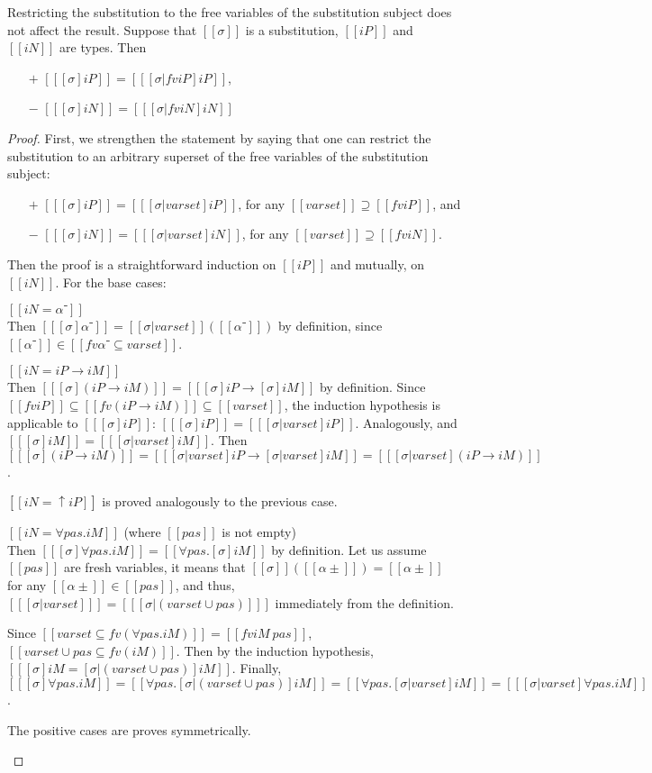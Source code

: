 \begin{lemma}
  \label{lemma:subst-restr-fv}
  Restricting the substitution to the free variables of the
  substitution subject does not affect the result.
  Suppose that $[[σ]]$ is a substitution,
  $[[iP]]$ and $[[iN]]$ are types. Then
 \begin{itemize}
    \item[$+$] $[[ [σ]iP ]] = [[ [σ|fv iP]iP ]]$,
    \item[$-$] $[[ [σ]iN ]] = [[ [σ|fv iN]iN ]]$
  \end{itemize}
\end{lemma}
\begin{proof}
  First, we strengthen the statement by saying that
  one can restrict the substitution to an arbitrary
  superset of the free variables of the substitution subject:
 \begin{itemize}
    \item[$+$] $[[ [σ]iP ]] = [[ [σ|varset]iP ]]$, for any $[[varset]] \supseteq [[fv iP]]$, and
    \item[$-$] $[[ [σ]iN ]] = [[ [σ|varset]iN ]]$, for any $[[varset]] \supseteq [[fv iN]]$.
  \end{itemize}
  Then the proof is a straightforward induction on $[[iP]]$ and mutually, on $[[iN]]$.
  For the base cases: 
  \begin{caseof}
    \item $[[iN = α⁻]]$\\
      Then $[[ [σ]α⁻ ]] = [[σ|varset]] ([[α⁻]])$ by definition, 
      since $[[α⁻]] \in [[fv α⁻ ⊆ varset]]$.
    \item $[[iN = iP → iM]]$\\
      Then $[[ [σ](iP → iM) ]] = [[ [σ]iP → [σ]iM ]]$ by definition.
      Since $[[fv iP]] \subseteq [[fv(iP → iM)]] \subseteq [[varset]]$, 
      the induction hypothesis is applicable to $[[ [σ]iP ]]$: 
      $[[ [σ]iP ]] = [[ [σ|varset]iP ]]$. 
      Analogously, and $[[ [σ]iM ]] = [[ [σ|varset]iM ]]$.
      Then 
      $[[ [σ](iP → iM) ]] = [[ [σ|varset]iP → [σ|varset]iM ]]
       = [[ [σ|varset](iP → iM) ]]$.
    \item $[[iN = ↑iP]]$ is proved analogously to the previous case.
    \item $[[iN = ∀pas.iM ]]$ (where $[[pas]]$ is not empty)\\
      Then $[[ [σ]∀pas.iM ]] = [[ ∀pas.[σ]iM ]]$ by definition.
      Let us assume $[[pas]]$ are fresh variables, 
      it means that $[[σ]]([[α± ]]) = [[α± ]]$ for any 
      $[[α± ]] \in [[pas]]$, and thus, 
      $[[ [σ|varset] ]] = [[ [σ|(varset ∪ {pas})] ]]$
      immediately from the definition. 

      Since $[[varset ⊆ fv(∀pas.iM)]] = [[fv iM \ {pas}]]$,
      $[[varset ∪ {pas} ⊆ fv(iM)]]$.
      Then by the induction hypothesis, 
      $[[ [σ]iM =  [σ|(varset ∪ {pas})]iM ]]$.
      Finally, 
      $[[ [σ]∀pas.iM ]] = [[ ∀pas.[σ|(varset ∪ {pas})]iM ]] = 
      [[ ∀pas.[σ|varset]iM ]] = [[ [σ|varset]∀pas.iM ]]$.
    \item The positive cases are proves symmetrically. 
  \end{caseof}
\end{proof}

